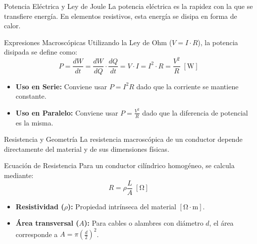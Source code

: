 \documentclass[10pt, aspectratio=169]{beamer}
\begin{document}
\primeraDiapo


\begin{frame}{Potencia Eléctrica y Ley de Joule}
    La potencia eléctrica es la rapidez con la que se transfiere energía. En elementos resistivos, esta energía se disipa en forma de calor.
    \begin{boxTeoria}{Expresiones Macroscópicas}
        Utilizando la Ley de Ohm ($V = I \cdot R$), la potencia disipada se define como:
        \begin{equation*}
            P = \frac{dW}{dt} = \frac{dW}{dQ} \cdot \frac{dQ}{dt}= V \cdot I = I^2 \cdot R = \frac{V^2}{R} \;[\unit{\W}]
        \end{equation*}
    \end{boxTeoria}

    \begin{itemize}
        \item \textbf{Uso en Serie:} Conviene usar $P = I^2 R$ dado que la corriente se mantiene constante.
        \item \textbf{Uso en Paralelo:} Conviene usar $P = \frac{V^2}{R}$ dado que la diferencia de potencial es la misma.
    \end{itemize}
\end{frame}

\begin{frame}{Resistencia y Geometría}
    La resistencia macroscópica de un conductor depende directamente del material y de sus dimensiones físicas.
    \begin{boxTeoria}{Ecuación de Resistencia}
        Para un conductor cilíndrico homogéneo, se calcula mediante:
        \begin{equation*}
            R = \rho \frac{L}{A} \;[\unit{\ohm}]
        \end{equation*}
    \end{boxTeoria}

    \begin{itemize}
        \item \textbf{Resistividad ($\rho$):} Propiedad intrínseca del material $[\unit{\ohm\cdot\meter}]$.
        \item \textbf{Área transversal ($A$):} Para cables o alambres con diámetro $d$, el área corresponde a $A = \pi \left(\frac{d}{2}\right)^2$.
    \end{itemize}
\end{frame}
\end{document}
